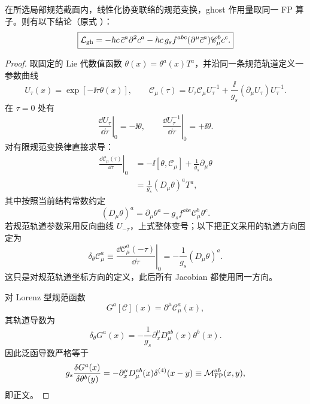 \begin{proposition}[规范轨道微分与 FP 算子]
在所选局部规范截面内，线性化协变联络的规范变换，ghost 作用量取同一 FP 算子。则有以下结论（原式 ）：
\begin{equation*}
\boxed{
\mathcal L_{\rm gh}
=-\hbar c\,\bar c^a\partial^2c^a
-\hbar c\,g_sf^{abc}(\partial^\mu\bar c^a)\mathscr C_\mu^b c^c.}
\end{equation*}
\end{proposition}
\begin{proof}
取固定的 Lie 代数值函数 $\theta(x)=\theta^a(x)T^a$，并沿同一条规范轨道定义一参数曲线
\begin{equation*}
 U_\tau(x)=\exp[-\ii\tau\theta(x)],
 \qquad
 \mathscr C_\mu(\tau)
 =U_\tau\mathscr C_\mu U_\tau^{-1}
 +\frac{\ii}{g_s}(\partial_\mu U_\tau)U_\tau^{-1}.
\end{equation*}
在 $\tau=0$ 处有
\begin{equation*}
 \left.\frac{\dd U_\tau}{\dd\tau}\right|_0=-\ii\theta,
 \qquad
 \left.\frac{\dd U_\tau^{-1}}{\dd\tau}\right|_0=+\ii\theta .
\end{equation*}
对有限规范变换律直接求导：
\begin{align*}
 \left.\frac{\dd\mathscr C_\mu(\tau)}{\dd\tau}\right|_0
 &=-\ii[\theta,\mathscr C_\mu]
 +\frac1{g_s}\partial_\mu\theta\\
 &=\frac1{g_s}(D_\mu\theta)^aT^a,
\end{align*}
其中按照当前结构常数约定
\begin{equation*}
 (D_\mu\theta)^a
 =\partial_\mu\theta^a-g_sf^{abc}\mathscr C_\mu^b\theta^c.
\end{equation*}
若规范轨道参数采用反向曲线 $U_{-\tau}$，上式整体变号；以下把正文采用的轨道方向固定为
\begin{equation*}
 \delta_\theta\mathscr C_\mu^a
 \equiv
 \left.\frac{\dd\mathscr C_\mu^a(-\tau)}{\dd\tau}\right|_0
 =-\frac1{g_s}(D_\mu\theta)^a.
\end{equation*}
这只是对规范轨道坐标方向的定义，此后所有 Jacobian 都使用同一方向。

对 Lorenz 型规范函数
\begin{equation*}
 G^a[\mathscr C](x)=\partial^\mu\mathscr C_\mu^a(x),
\end{equation*}
其轨道导数为
\begin{equation*}
 \delta_\theta G^a(x)
 =-\frac1{g_s}\partial_x^\mu D_\mu^{ab}(x)\theta^b(x).
\end{equation*}
因此泛函导数严格等于
\begin{equation*}
 g_s\frac{\delta G^a(x)}{\delta\theta^b(y)}
 =-\partial_x^\mu D_\mu^{ab}(x)\delta^{(4)}(x-y)
 \equiv\mathcal M_{\rm FP}^{ab}(x,y),
\end{equation*}
即正文。


\end{proof}
